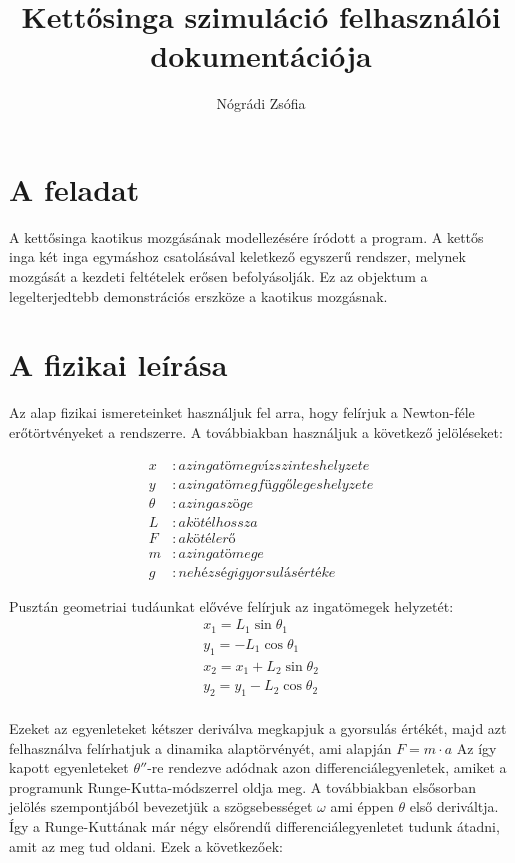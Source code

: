\documentclass{article}
\title{Kettősinga szimuláció felhasználói dokumentációja}
\author{Nógrádi Zsófia}
\begin{document}
\maketitle
\pagebreak

\section{A feladat}
A kettősinga kaotikus mozgásának modellezésére íródott a program. A kettős inga két inga egymáshoz csatolásával keletkező egyszerű 
rendszer, melynek mozgását a kezdeti feltételek erősen befolyásolják. Ez az objektum a legelterjedtebb demonstrációs erszköze a 
kaotikus mozgásnak.

\section{A fizikai leírása}
Az alap fizikai ismereteinket használjuk fel arra, hogy felírjuk a Newton-féle erőtörtvényeket a rendszerre. A továbbiakban használjuk
a következő jelöléseket: 

\begin{align*}
x &:  az ingatömeg vízszintes helyzete \\
y &: az ingatömeg függőleges helyzete \\
\theta &: az inga szöge \\
L &: a kötél hossza \\
F &: a kötélerő \\
m &: az ingatömege \\
g &: nehézségi gyorsulás értéke
\end{align*}

Pusztán geometriai tudáunkat elővéve felírjuk az ingatömegek helyzetét: 
\begin{gather*}
x_1=L_1 \sin \theta_1 \\
y_1= - L_1 \cos \theta_1 \\
x_2 = x_1 + L_2 \sin \theta_2 \\
y_2= y_1 - L_2 \cos \theta_2 \\
\end{gather*}

Ezeket az egyenleteket kétszer deriválva megkapjuk a gyorsulás értékét, majd azt felhasználva felírhatjuk a dinamika alaptörvényét, 
ami alapján $F=m \cdot a$ Az így kapott egyenleteket $\theta ''$-re rendezve adódnak azon differenciálegyenletek, amiket a programunk 
Runge-Kutta-módszerrel oldja meg. A továbbiakban elsősorban jelölés szempontjából bevezetjük a szögsebességet $\omega $ ami éppen 
$\theta$ első deriváltja. Így a Runge-Kuttának már négy elsőrendű differenciálegyenletet tudunk átadni, amit az meg tud oldani. Ezek 
a következőek:
\end{document}
